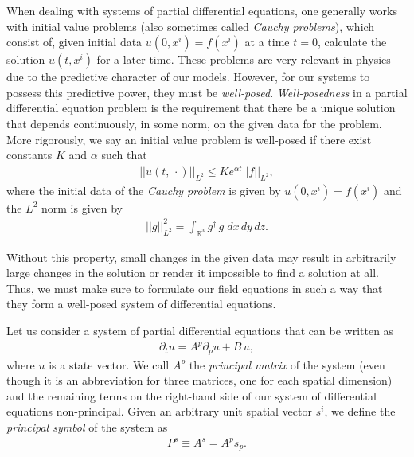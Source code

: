 When dealing with systems of partial differential equations, one generally works with initial value problems (also sometimes called \textit{Cauchy problems}), which consist of, given initial data $u(0,x^i) = f(x^i)$ at a time $t = 0$, calculate the solution $u(t,x^i)$ for a later time. These problems are very relevant in physics due to the predictive character of our models. However, for our systems to possess this predictive power, they must be \textit{well-posed}. \textit{Well-posedness} in a partial differential equation problem is the requirement that there be a unique solution that depends continuously, in some norm, on the given data for the problem. More rigorously, we say an initial value problem is well-posed if there exist constants $K$ and $\alpha$ such that
%
\begin{align}
 ||u(t,\, \cdot)||_{L^2} 
     \leq K e^{\alpha t} ||f||_{L^2},
\end{align}
%
where the initial data of the \textit{Cauchy problem} is given by $u(0,x^i) = f(x^i)$ and the $L^2$ norm is given by
%
\begin{align}
 ||g||_{L^2}^2 
     = \int_{\mathbb{R}^3} g^\dagger\, g \; dx\,dy\,dz.
\end{align}

Without this property, small changes in the given data may result in arbitrarily large changes in the solution or render it impossible to find a solution at all. Thus, we must make sure to formulate our field equations in such a way that they form a well-posed system of differential equations.

Let us consider a system of partial differential equations that can be written as
%
\begin{align}
    \partial_t u = A^p \partial_p u + B \, u,
    \label{eq:strong_hyp}
\end{align}
%
where $u$ is a state vector. We call $A^p$ the \textit{principal matrix} of the system (even though it is an abbreviation for three matrices, one for each spatial dimension) and the remaining terms on the right-hand side of our system of differential equations non-principal. Given an arbitrary unit spatial vector $s^i$, we define the \textit{principal symbol} of the system as
%
\begin{align}
 P^s \equiv A^s = A^p s_p.
\end{align}

